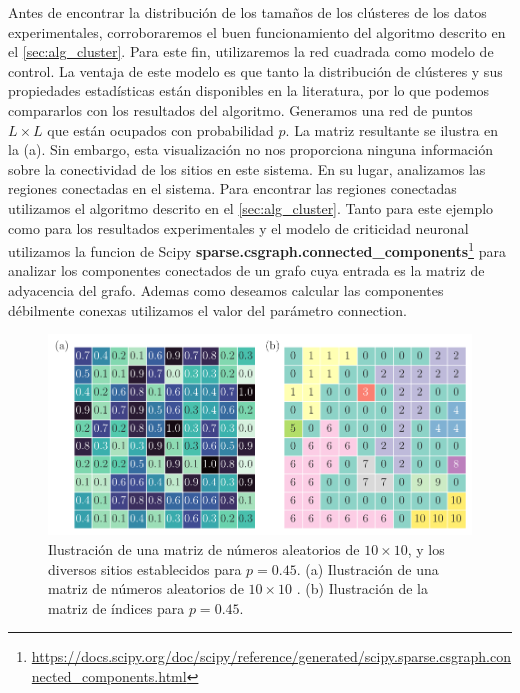  Antes de encontrar la distribución de los tamaños de los clústeres de los datos experimentales,   corroboraremos el buen funcionamiento del algoritmo  descrito en el  \cref{sec:alg_cluster}. Para este fin,  utilizaremos la red cuadrada como  modelo de control.  La ventaja de este modelo es que tanto la   distribución de clústeres  y sus propiedades estadísticas están disponibles  en la literatura, por lo que podemos compararlos con los resultados del  algoritmo.   Generamos  una red de puntos $L\times L$ que están ocupados con probabilidad $p$.   La matriz resultante se ilustra en la (a). Sin embargo, esta visualización no nos proporciona ninguna información sobre la conectividad de los sitios en este sistema. En su lugar, analizamos las regiones conectadas en el sistema. Para encontrar las regiones conectadas utilizamos el algoritmo descrito en el  \cref{sec:alg_cluster}. Tanto para este ejemplo como para los resultados experimentales y el modelo  de criticidad neuronal utilizamos la funcion de Scipy \textbf{sparse.csgraph.connected\_components}\footnote{\url{https://docs.scipy.org/doc/scipy/reference/generated/scipy.sparse.csgraph.connected_components.html}} para analizar los componentes conectados de un grafo cuya entrada es  la matriz de adyacencia del grafo.  Ademas como deseamos calcular las componentes débilmente conexas utilizamos el valor  del parámetro  connection. 
 
 \begin{figure}[h!]
 	\centering{}\includegraphics[width=\imsize]{matriz_clusteres.pdf}
 	\caption[ Ilustración de una matriz de números aleatorios de $10\times10$, y los diversos sitios establecidos para $p=0.45$. ]{ Ilustración de una matriz de números aleatorios de $10\times10$, y los diversos sitios establecidos para $p=0.45$. (a) Ilustración de una matriz de números aleatorios de $10\times10$ . (b) Ilustración de la matriz de índices  para $p = 0.45$.}\label{f:matriz_clusteres}  
 \end{figure}

